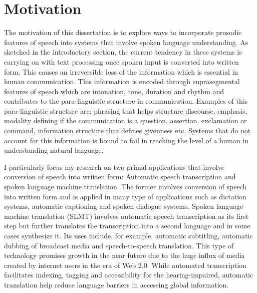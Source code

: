 
\section{Motivation}

The motivation of this dissertation is to explore ways to incorporate prosodic features of speech into systems that involve spoken language understanding. As sketched in the introductory section, the current tendency in these systems is carrying on with text processing once spoken input is converted into written form. This causes an irreversible loss of the information which is essential in human communication. This information is encoded through suprasegmental features of speech which are intonation, tone, duration and rhythm and contributes to the para-linguistic structure in communication. Examples of this para-linguistic structure are: phrasing that helps structure discourse, emphasis, modality defining if the communication is a question, assertion, exclamation or command, information structure that defines givenness etc. Systems that do not account for this information is bound to fail in reaching the level of a human in understanding natural language. 

I particularly focus my research on two primal applications that involve conversion of speech into written form: Automatic speech transcription and spoken language machine translation. The former involves conversion of speech into written form and is applied in many type of applications such as dictation systems, automatic captioning and spoken dialogue systems. Spoken language machine translation (SLMT) involves automatic speech transcription as its first step but further translates the transcription into a second language and in some cases synthesize it. Its uses include, for example, automatic subtitling, automatic dubbing of broadcast media and speech-to-speech translation. This type of technology promises growth in the near future due to the huge influx of media created by internet users in the era of Web 2.0. While automated transcription facilitates indexing, tagging and accessibility for the hearing-impaired, automatic translation help reduce language barriers in accessing global information.


